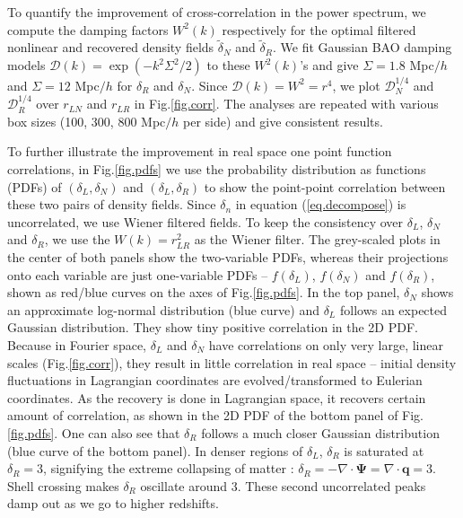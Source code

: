\documentclass[aps,prd,twocolumn,superscriptaddress,amsfont,amssymb,amsmath,nofootinbib,showpacs,balancelastpage]{revtex4-1}
\newcommand{\bs}{\boldsymbol}
\begin{document}
To quantify the improvement of cross-correlation in the power
spectrum, we compute the 
damping factors $W^2(k)$ respectively for the optimal filtered 
nonlinear and recovered density fields $\tilde\delta_N$
and $\tilde\delta_R$.
We fit Gaussian BAO damping models
${\mathcal D}(k)=\exp(-k^2\Sigma^2/2)$ to these $W^2(k)$'s
and give $\Sigma=1.8$ Mpc$/h$ and $\Sigma=12$ 
Mpc$/h$ for $\delta_R$ and $\delta_N$.
Since ${\mathcal D}(k)=W^2=r^4$, we plot
${\mathcal D}_N^{1/4}$ and ${\mathcal D}_R^{1/4}$
over $r_{LN}$ and $r_{LR}$ in Fig.\ref{fig.corr}.
The analyses are repeated with various box sizes (100, 300, 800 Mpc$/h$ per side)
and give consistent results.

To further illustrate the improvement in real space
one point function correlations,
in Fig.\ref{fig.pdfs} we use the probability distribution
as functions (PDFs) of $(\delta_L,\delta_N)$ and $(\delta_L,\delta_R)$
to show the point-point correlation between these two pairs of density
fields. Since $\delta_n$ in equation (\ref{eq.decompose}) is
uncorrelated, we use Wiener filtered fields. To keep the
consistency over $\delta_L$, $\delta_N$ and $\delta_R$, we
use the $W(k)=r^2_{LR}$ as the Wiener filter.
The grey-scaled plots in the center of both panels show the two-variable PDFs,
whereas their projections onto each variable are just
one-variable PDFs -- $f(\delta_L)$, $f(\delta_N)$ and $f(\delta_R)$, shown
as red/blue curves on the axes of Fig.\ref{fig.pdfs}.
In the top panel, $\delta_N$ shows an approximate log-normal
distribution (blue curve) and $\delta_L$ follows an expected
Gaussian distribution. They show tiny positive correlation in the
2D PDF.
Because in Fourier space, $\delta_L$ and $\delta_N$ have
correlations on only very large, linear scales (Fig.\ref{fig.corr}),
they result in little correlation in real space -- initial density fluctuations
in Lagrangian coordinates are evolved/transformed to Eulerian coordinates.
As the recovery is done in Lagrangian space, it recovers
certain amount of correlation, as shown in the 2D PDF of the bottom panel
of Fig.\ref{fig.pdfs}. One can also see that $\delta_R$ follows
a much closer Gaussian distribution (blue curve of the bottom panel).
In denser regions of $\delta_L$, $\delta_R$ is saturated at
$\delta_R=3$, signifying the extreme collapsing of matter \citep{2013MNRAS.428..141N}:
$\delta_R=-\nabla\cdot\bs\Psi=\nabla\cdot\bs q=3$. Shell crossing
makes $\delta_R$ oscillate around 3. These second uncorrelated peaks
damp out as we go to higher redshifts.
\end{document}
